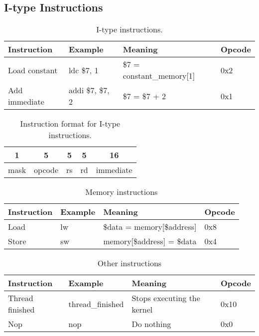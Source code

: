 \documentclass[../main/report.tex]{subfiles}
\begin{document}
\subsection{I-type Instructions}
\begin{table}[H]
    \begin{tabular}{llll}
        \textbf{Instruction} & \textbf{Example} & \textbf{Meaning}          & \textbf{Opcode} \\
        \hline
        \hline
         Load constant       & ldc \$7, 1       & \$7 = constant\_memory[1] & 0x2 \\
         Add immediate       & addi \$7, \$7, 2 & \$7 = \$7 + 2             & 0x1
    \end{tabular}
    \label{table:i_type_instructions}
    \caption{I-type instructions.}
\end{table}

\begin{table}[H]
    \centering
    \begin{tabular}{|c|c|c|c|c|}
    \multicolumn{1}{c}{1} & \multicolumn{1}{c}{5} & \multicolumn{1}{c}{5}  & \multicolumn{1}{c}{5}  & \multicolumn{1}{c}{16} \\ \hline
    mask & opcode & rs & rd & immediate \\ \hline
    \end{tabular}
    \label{table:i_type_format}
    \caption{Instruction format for I-type instructions.}
\end{table}

\begin{table}[H]
    \begin{tabular}{llll}
        \textbf{Instruction} & \textbf{Example} & \textbf{Meaning} & \textbf{Opcode} \\
        \hline
        \hline
         Load                & lw               & \$data = memory[\$address] & 0x8 \\
         Store               & sw               & memory[\$address] = \$data & 0x4\\
    \end{tabular}
    \label{table:memory_type_instructions}
    \caption{Memory instructions}
\end{table}

\begin{table}[H]
    \begin{tabular}{llll}
        \textbf{Instruction} & \textbf{Example} & \textbf{Meaning} & \textbf{Opcode} \\
        \hline
        \hline
         Thread finished     & thread\_finished & Stops executing the kernel & 0x10 \\
         Nop                 & nop              & Do nothing                 & 0x0 \\
    \end{tabular}
    \label{table:misc_instructions}
    \caption{Other instructions}
\end{table}
\end{document}
